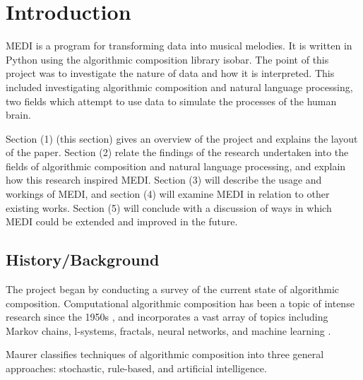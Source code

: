 \documentclass[runningheads,a4paper]{llncs}
\begin{document}
\section{Introduction}

MEDI is a program for transforming data into musical melodies. It is written in
Python using the algorithmic composition library isobar. The point of this
project was to investigate the nature of data and how it is interpreted. This
included investigating algorithmic composition and natural language processing,
two fields which attempt to use data to simulate the processes of the human
brain.

Section (1) (this section) gives an overview of the project and explains the layout
of the paper. Section (2) relate the findings of the research undertaken into the
fields of algorithmic composition and natural language processing, and explain
how this research inspired MEDI. Section (3) will describe the usage and workings
of MEDI, and section (4) will examine MEDI in relation to other existing works.
Section (5) will conclude with a discussion of ways in which MEDI could be
extended and improved in the future.




\subsection{History/Background}

The project began by conducting a survey of the current state of algorithmic
composition. Computational algorithmic composition has been a topic of intense
research since the 1950s \cite{edwards11}, and incorporates a vast array of
topics including Markov chains, l-systems, fractals, neural networks, and
machine learning \cite{nierhaus09}.

Maurer \cite{maurer99} classifies techniques of algorithmic composition into
three general approaches: stochastic, rule-based, and artificial intelligence.
\end{document}
